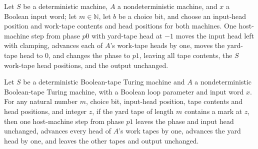 \begin{theorem}
\label{Turing.ClockHost.p0_turn}
\leanok
{}
Let $S$ be a deterministic machine, $A$ a nondeterministic machine, and $x$ a Boolean
input word; let $m\in\mathbb N$, let $b$ be a choice bit, and choose an input-head
position and work-tape contents and head positions for both machines. One host-machine
step from phase $p0$ with yard-tape head at $-1$ moves the input head left with
clamping, advances each of $A$’s work-tape heads by one, moves the yard-tape head to
$0$, and changes the phase to $p1$, leaving all tape contents, the $S$ work-tape head
positions, and the output unchanged.
\end{theorem}

\begin{theorem}
\label{Turing.ClockHost.p1_mark}
\leanok
{}
Let $S$ be a deterministic Boolean-tape Turing machine and $A$ a nondeterministic
Boolean-tape Turing machine, with a Boolean loop parameter and input word $x$. For any
natural number $m$, choice bit, input-head position, tape contents and head positions,
and integer $z$, if the yard tape of length $m$ contains a mark at $z$, then one
host-machine step from phase $p1$ leaves the phase and input head unchanged, advances
every head of $A$’s work tapes by one, advances the yard head by one, and leaves the
other tapes and output unchanged.
\end{theorem}

